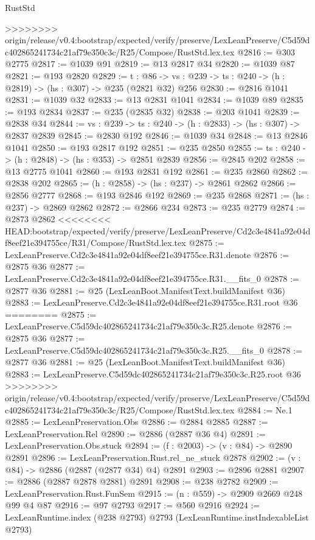 \begin{lexlean}{RustStd}
\begin{coremodule}
{\begin{coremodule}
{{{{>>>>>>>> origin/release/v0.4:bootstrap/expected/verify/preserve/LexLeanPreserve/C5d59dc402865241734c21af79e350c3c/R25/Compose/RustStd.lex.tex
@2816 := @303 @2775
@2817 := @1039 @91
@2819 := @13 @2817 @34
@2820 := @1039 @87
@2821 := @193 @2820
@2829 := {t : @86} ->
  {vs : @239} -> {ts : @240} -> (h : @2819) -> (hs : @307) -> @235 (@2821 @32) @256
@2830 := @2816 @1041
@2831 := @1039 @32
@2833 := @13 @2831 @1041
@2834 := @1039 @89
@2835 := @193 @2834
@2837 := @235 (@2835 @32)
@2838 := @203 @1041
@2839 := @2838 @34
@2844 := {vs : @239} -> {ts : @240} -> (h : @2833) -> (hs : @307) -> @2837 @2839
@2845 := @2830 @192
@2846 := @1039 @34
@2848 := @13 @2846 @1041
@2850 := @193 @2817 @192
@2851 := @235 @2850
@2855 := {ts : @240} -> (h : @2848) -> (hs : @353) -> @2851 @2839
@2856 := @2845 @202
@2858 := @13 @2775 @1041
@2860 := @193 @2831 @192
@2861 := @235 @2860
@2862 := @2838 @202
@2865 := (h : @2858) -> (hs : @237) -> @2861 @2862
@2866 := @2856 @2777
@2868 := @193 @2846 @192
@2869 := @235 @2868
@2871 := (hs : @237) -> @2869 @2862
@2872 := @2866 @234
@2873 := @235 @2779
@2874 := @2873 @2862
<<<<<<<< HEAD:bootstrap/expected/verify/preserve/LexLeanPreserve/Cd2c3e4841a92e04df8eef21e394755ce/R31/Compose/RustStd.lex.tex
@2875 := LexLeanPreserve.Cd2c3e4841a92e04df8eef21e394755ce.R31.denote
@2876 := @2875 @36
@2877 := LexLeanPreserve.Cd2c3e4841a92e04df8eef21e394755ce.R31.__fits_0
@2878 := @2877 @36
@2881 := @25 (LexLeanBoot.ManifestText.buildManifest @36)
@2883 := LexLeanPreserve.Cd2c3e4841a92e04df8eef21e394755ce.R31.root @36
========
@2875 := LexLeanPreserve.C5d59dc402865241734c21af79e350c3c.R25.denote
@2876 := @2875 @36
@2877 := LexLeanPreserve.C5d59dc402865241734c21af79e350c3c.R25.__fits_0
@2878 := @2877 @36
@2881 := @25 (LexLeanBoot.ManifestText.buildManifest @36)
@2883 := LexLeanPreserve.C5d59dc402865241734c21af79e350c3c.R25.root @36
>>>>>>>> origin/release/v0.4:bootstrap/expected/verify/preserve/LexLeanPreserve/C5d59dc402865241734c21af79e350c3c/R25/Compose/RustStd.lex.tex
@2884 := Ne.{1}
@2885 := LexLeanPreservation.Obs
@2886 := @2884 @2885
@2887 := LexLeanPreservation.Rel
@2890 := @2886 (@2887 @36 @4)
@2891 := LexLeanPreservation.Obs.stuck
@2894 := (f : @2003) -> (v : @84) -> @2890 @2891
@2896 := LexLeanPreservation.Rust.rel_ne_stuck @2878
@2902 := (v : @84) -> @2886 (@2887 (@2877 @34) @4) @2891
@2903 := @2896 @2881
@2907 := @2886 (@2887 @2878 @2881) @2891
@2908 := @238 @2782
@2909 := LexLeanPreservation.Rust.FunSem
@2915 := (n : @559) -> @2909 @2669 @248 @99 @4 @87
@2916 := @97 @2793
@2917 := @560 @2916
@2924 := LexLeanRuntime.index (@238 @2793) @2793 (LexLeanRuntime.instIndexableList @2793)
}}}}
\end{coremodule}}
\end{coremodule}
\end{lexlean}
